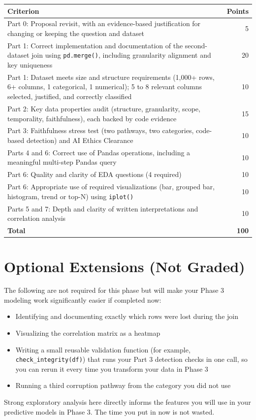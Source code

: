 \documentclass[11pt,letterpaper]{article}
\newcommand{\code}[1]{\texttt{#1}}
\begin{document}
\begin{center}
\renewcommand{\arraystretch}{1.25}
\begin{tabularx}{\textwidth}{@{}>{\raggedright\arraybackslash}X r@{}}
\toprule
\textbf{Criterion} & \textbf{Points} \\
\midrule
Part 0: Proposal revisit, with an evidence-based justification for changing or keeping the question and dataset & 5 \\
Part 1: Correct implementation and documentation of the second-dataset join using \code{pd.merge()}, including granularity alignment and key uniqueness & 20 \\
Part 1: Dataset meets size and structure requirements (1,000+ rows, 6+ columns, 1 categorical, 1 numerical); 5 to 8 relevant columns selected, justified, and correctly classified & 10 \\
Part 2: Key data properties audit (structure, granularity, scope, temporality, faithfulness), each backed by code evidence & 15 \\
Part 3: Faithfulness stress test (two pathways, two categories, code-based detection) and AI Ethics Clearance & 10 \\
Parts 4 and 6: Correct use of Pandas operations, including a meaningful multi-step Pandas query & 10 \\
Part 6: Quality and clarity of EDA questions (4 required) & 10 \\
Part 6: Appropriate use of required visualizations (bar, grouped bar, histogram, trend or top-N) using \code{iplot()} & 10 \\
Parts 5 and 7: Depth and clarity of written interpretations and correlation analysis & 10 \\
\midrule
\textbf{Total} & \textbf{100} \\
\bottomrule
\end{tabularx}
\end{center}

\section{Optional Extensions (Not Graded)}

The following are not required for this phase but will make your Phase 3 modeling work significantly easier if completed now:
\begin{itemize}
  \item Identifying and documenting exactly which rows were lost during the join
  \item Visualizing the correlation matrix as a heatmap
  \item Writing a small reusable validation function (for example, \code{check\_integrity(df)}) that runs your Part 3 detection checks in one call, so you can rerun it every time you transform your data in Phase 3
  \item Running a third corruption pathway from the category you did not use
\end{itemize}

Strong exploratory analysis here directly informs the features you will use in your predictive models in Phase 3. The time you put in now is not wasted.
\end{document}
